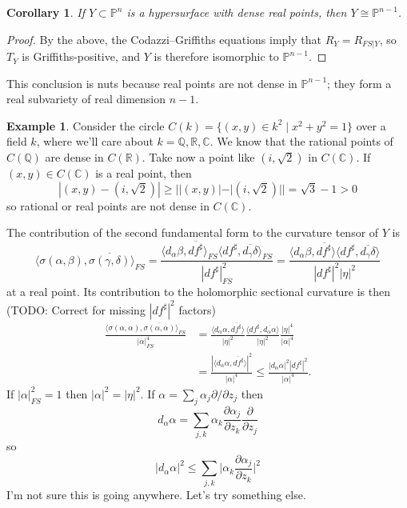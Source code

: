 \documentclass[11pt]{article}
\newtheorem{coro}[theo]{Corollary}
\theoremstyle{definition}
\newtheorem{exam}[theo]{Example}
\newcommand{\kk}[1]{\mathbb{#1}}
\def\ov#1{\overline{#1}}
\begin{document}
\begin{coro}
If $Y \subset \kk P^{n}$ is a hypersurface with dense real points, then $Y \cong \kk P^{n-1}$.
\end{coro}

\begin{proof}
By the above, the Codazzi--Griffiths equations imply that $R_{Y} = R_{FS|Y}$, so $T_{Y}$ is Griffiths-positive, and $Y$ is therefore isomorphic to $\kk P^{n-1}$.
\end{proof}

This conclusion is nuts because real points are not dense in $\kk P^{n-1}$; they form a real subvariety of real dimension $n-1$.

\begin{exam}
Consider the circle $C(k) = \{(x,y) \in k^{2} \mid x^{2} + y^{2} = 1\}$ over a field $k$, where we'll care about $k = \kk Q, \kk R, \kk C$.
We know that the rational points of $C(\kk Q)$ are dense in $C(\kk R)$.
Take now a point like $(i,\sqrt 2)$ in $C(\kk C)$.
If $(x,y) \in  C(\kk C)$ is a real point, then
\[
  |(x,y) - (i,\sqrt 2)|
  \geq ||(x,y)| - |(i,\sqrt 2)||
  = \sqrt 3 - 1 > 0
\]
so rational or real points are not dense in $C(\kk C)$.
\end{exam}


The contribution of the second fundamental form to the curvature tensor of $Y$ is
\[
  \langle \sigma(\alpha, \beta), \ov{\sigma(\gamma, \delta)} \rangle_{FS}
  = \frac{\langle d_{\alpha}\beta, \ov{df^{\sharp}} \rangle_{FS}
  \langle df^{\sharp}, \ov{d_{\gamma}\delta} \rangle_{FS}}{|df^{\sharp}|^{2}_{FS}}
  = \frac{\langle d_{\alpha}\beta, \ov{df^{\sharp}} \rangle
  \langle df^{\sharp}, \ov{d_{\gamma}\delta} \rangle }{|df^{\sharp}|^{2}|\eta|^{2}}
\]
at a real point. Its contribution to the holomorphic sectional curvature is then
(TODO: Correct for missing $|df^{\sharp}|^{2}$ factors)
\begin{align*}
  \frac{\langle \sigma(\alpha, \alpha), \ov{\sigma(\alpha, \alpha)} \rangle_{FS}}{|\alpha|^{4}_{FS}}
  &= \frac{\langle d_{\alpha}\alpha, \ov{df^{\sharp}} \rangle}{|\eta|^{2}}
  \frac{\langle df^{\sharp}, \ov{d_{\alpha}\alpha} \rangle}{|\eta|^{2}}
  \frac{|\eta|^{4}}{|\alpha|^{4}}
    \\
  &= \frac{|\langle d_{\alpha}\alpha, \ov{df^{\sharp}} \rangle|^{2}}{|\alpha|^{4}}
  \leq \frac{|d_{\alpha}\alpha|^{2} |df^{\sharp}|^{2}}{|\alpha|^{4}}.
\end{align*}
If $|\alpha|^{2}_{FS} = 1$ then $|\alpha|^{2} = |\eta|^{2}$.
If $\alpha = \sum_{j} \alpha_{j} \partial / \partial z_{j}$ then
\[
  d_{\alpha} \alpha
  = \sum_{j,k} \alpha_{k} \frac{\partial{\alpha_{j}}}{\partial z_{k}} \frac{\partial}{\partial z_{j}}
\]
so
\[
  |d_{\alpha} \alpha|^{2}
  \leq \sum_{j,k}
  \biggl|
  \alpha_{k} \frac{\partial{\alpha_{j}}}{\partial z_{k}}
  \biggr|^{2}
\]
I'm not sure this is going anywhere. Let's try something else.
\end{document}
